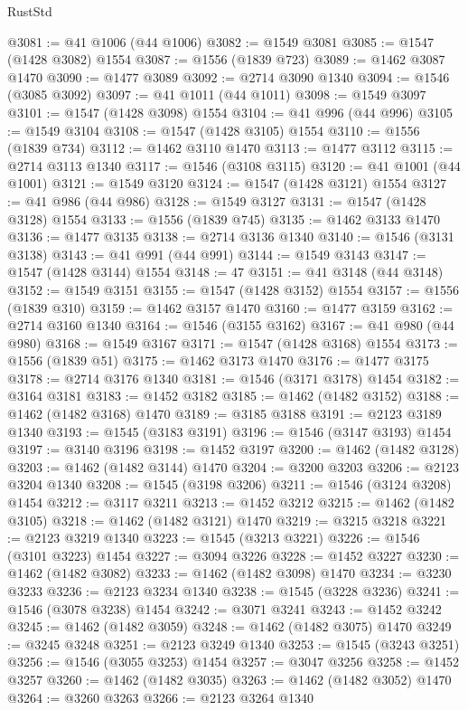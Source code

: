 \begin{lexlean}{RustStd}
\begin{coremodule}
@3081 := @41 @1006 (@44 @1006)
@3082 := @1549 @3081
@3085 := @1547 (@1428 @3082) @1554
@3087 := @1556 (@1839 @723)
@3089 := @1462 @3087 @1470
@3090 := @1477 @3089
@3092 := @2714 @3090 @1340
@3094 := @1546 (@3085 @3092)
@3097 := @41 @1011 (@44 @1011)
@3098 := @1549 @3097
@3101 := @1547 (@1428 @3098) @1554
@3104 := @41 @996 (@44 @996)
@3105 := @1549 @3104
@3108 := @1547 (@1428 @3105) @1554
@3110 := @1556 (@1839 @734)
@3112 := @1462 @3110 @1470
@3113 := @1477 @3112
@3115 := @2714 @3113 @1340
@3117 := @1546 (@3108 @3115)
@3120 := @41 @1001 (@44 @1001)
@3121 := @1549 @3120
@3124 := @1547 (@1428 @3121) @1554
@3127 := @41 @986 (@44 @986)
@3128 := @1549 @3127
@3131 := @1547 (@1428 @3128) @1554
@3133 := @1556 (@1839 @745)
@3135 := @1462 @3133 @1470
@3136 := @1477 @3135
@3138 := @2714 @3136 @1340
@3140 := @1546 (@3131 @3138)
@3143 := @41 @991 (@44 @991)
@3144 := @1549 @3143
@3147 := @1547 (@1428 @3144) @1554
@3148 := 47
@3151 := @41 @3148 (@44 @3148)
@3152 := @1549 @3151
@3155 := @1547 (@1428 @3152) @1554
@3157 := @1556 (@1839 @310)
@3159 := @1462 @3157 @1470
@3160 := @1477 @3159
@3162 := @2714 @3160 @1340
@3164 := @1546 (@3155 @3162)
@3167 := @41 @980 (@44 @980)
@3168 := @1549 @3167
@3171 := @1547 (@1428 @3168) @1554
@3173 := @1556 (@1839 @51)
@3175 := @1462 @3173 @1470
@3176 := @1477 @3175
@3178 := @2714 @3176 @1340
@3181 := @1546 (@3171 @3178) @1454
@3182 := @3164 @3181
@3183 := @1452 @3182
@3185 := @1462 (@1482 @3152)
@3188 := @1462 (@1482 @3168) @1470
@3189 := @3185 @3188
@3191 := @2123 @3189 @1340
@3193 := @1545 (@3183 @3191)
@3196 := @1546 (@3147 @3193) @1454
@3197 := @3140 @3196
@3198 := @1452 @3197
@3200 := @1462 (@1482 @3128)
@3203 := @1462 (@1482 @3144) @1470
@3204 := @3200 @3203
@3206 := @2123 @3204 @1340
@3208 := @1545 (@3198 @3206)
@3211 := @1546 (@3124 @3208) @1454
@3212 := @3117 @3211
@3213 := @1452 @3212
@3215 := @1462 (@1482 @3105)
@3218 := @1462 (@1482 @3121) @1470
@3219 := @3215 @3218
@3221 := @2123 @3219 @1340
@3223 := @1545 (@3213 @3221)
@3226 := @1546 (@3101 @3223) @1454
@3227 := @3094 @3226
@3228 := @1452 @3227
@3230 := @1462 (@1482 @3082)
@3233 := @1462 (@1482 @3098) @1470
@3234 := @3230 @3233
@3236 := @2123 @3234 @1340
@3238 := @1545 (@3228 @3236)
@3241 := @1546 (@3078 @3238) @1454
@3242 := @3071 @3241
@3243 := @1452 @3242
@3245 := @1462 (@1482 @3059)
@3248 := @1462 (@1482 @3075) @1470
@3249 := @3245 @3248
@3251 := @2123 @3249 @1340
@3253 := @1545 (@3243 @3251)
@3256 := @1546 (@3055 @3253) @1454
@3257 := @3047 @3256
@3258 := @1452 @3257
@3260 := @1462 (@1482 @3035)
@3263 := @1462 (@1482 @3052) @1470
@3264 := @3260 @3263
@3266 := @2123 @3264 @1340

\end{coremodule}
\end{lexlean}
